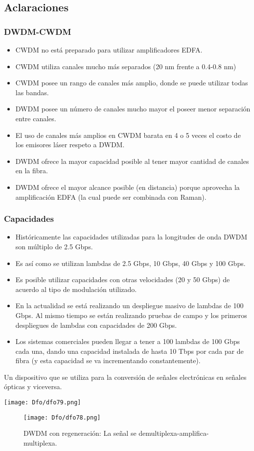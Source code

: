 \documentclass[
	12pt, %
	fleqn, %
	a4paper, %
	oneside, %
]{LegrandOrangeBook}
\begin{document}
\subsection{Aclaraciones}
\subsubsection{DWDM-CWDM}
\begin{itemize}
\item CWDM no está preparado para utilizar amplificadores EDFA.
\item CWDM utiliza canales mucho más separados (20 nm frente a 0.4-0.8 nm)
\item CWDM posee un rango de canales más amplio, donde se puede utilizar todas las bandas.
\item DWDM posee un número de canales mucho mayor el poseer menor separación entre canales. 
\item El uso de canales más amplios en CWDM barata en 4 o 5 veces el costo de los emisores láser respeto a DWDM.  
\item DWDM ofrece la mayor capacidad posible al tener mayor cantidad de canales en la fibra.
\item DWDM ofrece el mayor alcance posible (en distancia) porque aprovecha la amplificación EDFA (la cual puede ser combinada con Raman).
\end{itemize}
\subsubsection{Capacidades}
\begin{itemize}
\item Históricamente las capacidades utilizadas para la longitudes de onda DWDM son múltiplo de 2.5 Gbps. 
\item Es así como se utilizan lambdas de 2.5 Gbps, 10 Gbps, 40 Gbps y 100 Gbps. 
\item Es posible utilizar capacidades con otras velocidades (20 y 50 Gbps) de acuerdo al tipo de modulación utilizado.  
\item En la actualidad se está realizando un despliegue masivo de lambdas de 100 Gbps. Al mismo tiempo se están realizando pruebas de campo y los primeros despliegues de lambdas con capacidades de 200 Gbps.  
\item Los sistemas comerciales pueden llegar a tener a 100 lambdas de 100 Gbps cada una, dando una capacidad instalada de hasta 10 Tbps por cada par de fibra (y esta capacidad se va incrementando constantemente).  
\end{itemize}
\begin{vocabulary}[Transponder]
Un dispositivo que se utiliza para la conversión de señales electrónicas en señales ópticas y viceversa.
\begin{center}
\texttt{[image: Dfo/dfo79.png]}
\end{center}
\end{vocabulary}
\begin{figure}[H]
\centering
\texttt{[image: Dfo/dfo78.png]}
\caption{DWDM con regeneración: La señal se demultiplexa-amplifica-multiplexa.}
\end{figure}
\end{document}
